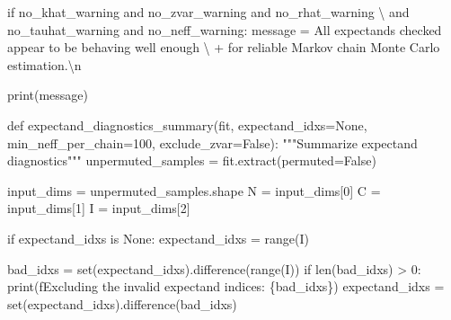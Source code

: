 \documentclass[
  letterpaper,
  DIV=11,
  numbers=noendperiod]{scrartcl}
\newenvironment{Shaded}{\begin{snugshade}}{\end{snugshade}}
\newcommand{\BuiltInTok}[1]{\textcolor[rgb]{0.00,0.23,0.31}{#1}}
\newcommand{\CharTok}[1]{\textcolor[rgb]{0.13,0.47,0.30}{#1}}
\newcommand{\CommentTok}[1]{\textcolor[rgb]{0.37,0.37,0.37}{#1}}
\newcommand{\ControlFlowTok}[1]{\textcolor[rgb]{0.00,0.23,0.31}{#1}}
\newcommand{\DecValTok}[1]{\textcolor[rgb]{0.68,0.00,0.00}{#1}}
\newcommand{\KeywordTok}[1]{\textcolor[rgb]{0.00,0.23,0.31}{#1}}
\newcommand{\NormalTok}[1]{\textcolor[rgb]{0.00,0.23,0.31}{#1}}
\newcommand{\OperatorTok}[1]{\textcolor[rgb]{0.37,0.37,0.37}{#1}}
\newcommand{\SpecialCharTok}[1]{\textcolor[rgb]{0.37,0.37,0.37}{#1}}
\newcommand{\SpecialStringTok}[1]{\textcolor[rgb]{0.13,0.47,0.30}{#1}}
\newcommand{\StringTok}[1]{\textcolor[rgb]{0.13,0.47,0.30}{#1}}
\newcommand{\VariableTok}[1]{\textcolor[rgb]{0.07,0.07,0.07}{#1}}
\begin{document}
\begin{Shaded}
\begin{Highlighting}[]
  \ControlFlowTok{if}\NormalTok{ no\_khat\_warning }\KeywordTok{and}\NormalTok{ no\_zvar\_warning }\KeywordTok{and}\NormalTok{ no\_rhat\_warning }\OperatorTok{\textbackslash{}}
     \KeywordTok{and}\NormalTok{ no\_tauhat\_warning }\KeywordTok{and}\NormalTok{ no\_neff\_warning:}
\NormalTok{    message }\OperatorTok{=}   \StringTok{\textquotesingle{}All expectands checked appear to be behaving well enough \textquotesingle{}}\NormalTok{ \textbackslash{}}
              \OperatorTok{+} \StringTok{\textquotesingle{}for reliable Markov chain Monte Carlo estimation.}\CharTok{\textbackslash{}n}\StringTok{\textquotesingle{}}
  
  \BuiltInTok{print}\NormalTok{(message)}
\end{Highlighting}
\end{Shaded}

\begin{Shaded}
\begin{Highlighting}[]
\KeywordTok{def}\NormalTok{ expectand\_diagnostics\_summary(fit,}
\NormalTok{                                  expectand\_idxs}\OperatorTok{=}\VariableTok{None}\NormalTok{,}
\NormalTok{                                  min\_neff\_per\_chain}\OperatorTok{=}\DecValTok{100}\NormalTok{,}
\NormalTok{                                  exclude\_zvar}\OperatorTok{=}\VariableTok{False}\NormalTok{):}
  \CommentTok{"""Summarize expectand diagnostics"""}
\NormalTok{  unpermuted\_samples }\OperatorTok{=}\NormalTok{ fit.extract(permuted}\OperatorTok{=}\VariableTok{False}\NormalTok{)}
  
\NormalTok{  input\_dims }\OperatorTok{=}\NormalTok{ unpermuted\_samples.shape}
\NormalTok{  N }\OperatorTok{=}\NormalTok{ input\_dims[}\DecValTok{0}\NormalTok{]}
\NormalTok{  C }\OperatorTok{=}\NormalTok{ input\_dims[}\DecValTok{1}\NormalTok{]}
\NormalTok{  I }\OperatorTok{=}\NormalTok{ input\_dims[}\DecValTok{2}\NormalTok{]}
  
  \ControlFlowTok{if}\NormalTok{ expectand\_idxs }\KeywordTok{is} \VariableTok{None}\NormalTok{:}
\NormalTok{    expectand\_idxs }\OperatorTok{=} \BuiltInTok{range}\NormalTok{(I)}
  
\NormalTok{  bad\_idxs }\OperatorTok{=} \BuiltInTok{set}\NormalTok{(expectand\_idxs).difference(}\BuiltInTok{range}\NormalTok{(I))}
  \ControlFlowTok{if} \BuiltInTok{len}\NormalTok{(bad\_idxs) }\OperatorTok{\textgreater{}} \DecValTok{0}\NormalTok{:}
    \BuiltInTok{print}\NormalTok{(}\SpecialStringTok{f\textquotesingle{}Excluding the invalid expectand indices: }\SpecialCharTok{\{}\NormalTok{bad\_idxs}\SpecialCharTok{\}}\SpecialStringTok{\textquotesingle{}}\NormalTok{)}
\NormalTok{    expectand\_idxs }\OperatorTok{=} \BuiltInTok{set}\NormalTok{(expectand\_idxs).difference(bad\_idxs)}


\end{Highlighting}
\end{Shaded}
\end{document}
